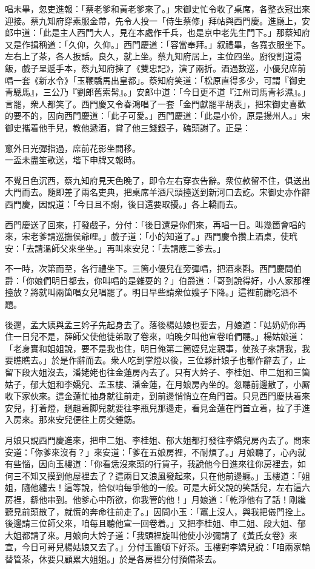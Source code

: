 唱未畢，忽吏進報：「蔡老爹和黃老爹來了。」宋御史忙令收了桌席，各整衣冠出來迎接。蔡九知府穿素服金帶，先令人投一「侍生蔡修」拜帖與西門慶。進廳上，安郎中道：「此是主人西門大人，見在本處作千兵，也是京中老先生門下。」那蔡知府又是作揖稱道：「久仰，久仰。」西門慶道：「容當奉拜。」叙禮畢，各寬衣服坐下。左右上了茶，各人扳話。良久，就上坐。蔡九知府居上，主位四坐。廚役割道湯飯，戲子呈遞手本，蔡九知府揀了《雙忠記》，{}演了兩折。酒過數巡，小優兒席前唱一套《新水令》「玉鞭驕馬出皇都」。蔡知府笑道：「松原直得多少，可謂『御史青驄馬』，三公乃『劉郎舊索髯』。」安郎中道：「今日更不道『江州司馬青衫濕』。」言罷，衆人都笑了。{}西門慶又令春鴻唱了一套「金門獻罷平胡表」，把宋御史喜歡的要不的，因向西門慶道：「此子可愛。」西門慶道：「此是小价，原是揚州人。」宋御史攜着他手兒，教他遞酒，賞了他三錢銀子，磕頭謝了。正是：

\begin{myquote}
窻外日光彈指過，席前花影坐間移。\\一盃未盡笙歌送，堦下申牌又報時。
\end{myquote}

不覺日色沉西，蔡九知府見天色晚了，即令左右穿衣告辭。衆位款留不住，俱送出大門而去。隨即差了兩名吏典，把桌席羊酒尺頭擡送到新河口去訖。宋御史亦作辭西門慶，因說道：「今日且不謝，後日還要取擾。」各上轎而去。

西門慶送了回來，打發戲子，分付：「後日還是你們來，再唱一日。叫幾箇會唱的來，宋老爹請巡撫侯爺哩。」戲子道：「小的知道了。」西門慶令攢上酒桌，使玳安：「去請溫師父來坐坐。」再叫來安兒：「去請應二爹去。」

不一時，次第而至，各行禮坐下。三箇小優兒在旁彈唱，把酒來斟。西門慶問伯爵：「你娘們明日都去，你叫唱的是雜耍的？」伯爵道：「哥到說得好，小人家那裡擡放？將就叫兩箇唱女兒唱罷了。明日早些請衆位嫂子下降。」這裡前廳吃酒不題。

後邊，孟大姨與孟三妗子先起身去了。落後楊姑娘也要去，月娘道：「姑奶奶你再住一日兒不是，薛師父使他徒弟取了卷來，咱晚夕叫他宣卷咱們聽。」楊姑娘道：「老身實和姐姐說，要不是我也住，明日俺第二箇姪兒定親事，使孩子來請我，我要瞧瞧去。」於是作辭而去。衆人吃到掌燈以後，三位夥計娘子也都作辭去了，止留下段大姐沒去，潘姥姥也往金蓮房內去了。只有大妗子、李桂姐、申二姐和三箇姑子，郁大姐和李嬌兒、孟玉樓、潘金蓮，在月娘房內坐的。忽聽前邊散了，小厮收下家伙來。這金蓮忙抽身就往前走，到前邊悄悄立在角門首。只見西門慶扶着來安兒，打着燈，趔趄着脚兒就要往李瓶兒那邊走，看見金蓮在門首立着，拉了手進入房來。那來安兒便往上房交鍾筯。

月娘只說西門慶進來，把申二姐、李桂姐、郁大姐都打發往李嬌兒房內去了。問來安道：「你爹來沒有？」來安道：「爹在五娘房裡，不耐煩了。」月娘聽了，心內就有些惱，{}因向玉樓道：「你看恁沒來頭的行貨子，我說他今日進來往你房裡去，如何三不知又摸到他屋裡去了？這兩日又浪風發起來，只在他前邊纏。」玉樓道：「姐姐，隨他纏去！這等說，恰似咱每爭他的一般。可是大師父說的笑話兒，左右這六房裡，繇他串到。他爹心中所欲，你我管的他！」月娘道：「乾淨他有了話！剛纔聽見前頭散了，就慌的奔命往前走了。」因問小玉：「竈上沒人，與我把儀門拴上。後邊請三位師父來，咱每且聽他宣一回卷着。」又把李桂姐、申二姐、段大姐、郁大姐都請了來。月娘向大妗子道：「我頭裡旋叫他使小沙彌請了《黃氏女卷》來宣，今日可哥兒楊姑娘又去了。」分付玉簫頓下好茶。玉樓對李嬌兒說：「咱兩家輪替管茶，休要只顧累大姐姐。」於是各房裡分付預備茶去。

